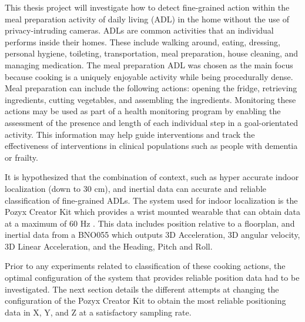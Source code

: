 
This thesis project will investigate how to detect fine-grained action within the meal preparation activity of daily living 
(ADL) in the home without the use of privacy-intruding cameras. ADLs are common activities that an individual 
performs inside their homes. These include walking around, eating, dressing, personal hygiene, toileting, 
transportation, meal preparation, house cleaning, and managing medication. The meal preparation ADL was chosen as the 
main focus because cooking is a uniquely enjoyable activity while being procedurally dense. Meal preparation can include 
the following actions: opening the fridge, retrieving ingredients, cutting vegetables, and assembling the ingredients. 
Monitoring these actions may be used as part of a health monitoring program by enabling the assessment of the presence and 
length of each individual step in a goal-orientated activity. This information may help guide interventions and track 
the effectiveness of interventions in clinical populations such as people with dementia or frailty. 


It is hypothesized that the combination of context, such as hyper accurate 
indoor localization (down to 30 cm), and inertial data can accurate and reliable 
classification of fine-grained ADLs. 
The system used for indoor localization is the Pozyx Creator Kit which provides a wrist mounted 
wearable that can obtain data at a maximum of 60 Hz \cite{noauthor_creator_nodate}. This data includes position relative to a 
floorplan, and inertial data from a BNO055 which outputs 3D Acceleration, 3D angular velocity, 
3D Linear Acceleration, and the Heading, Pitch and Roll.

Prior to any experiments related to classification of these cooking actions, the optimal 
configuration of the system that provides reliable position data had to be investigated. 
The next section details the different attempts at changing the configuration of the Pozyx 
Creator Kit to obtain the most reliable positioning data in X, Y, and Z at a satisfactory 
sampling rate. 
